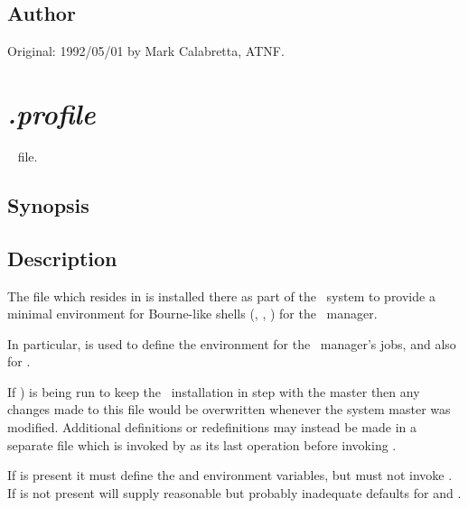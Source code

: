 \subsection*{Author}

Original: 1992/05/01 by Mark Calabretta, ATNF.


\newpage
\section{\textit{.profile}}
\label{.profile}

\aipspp\  file.

\subsection*{Synopsis}

\begin{synopsis}
\end{synopsis}

\subsection*{Description}

The  file which resides in  is installed there
as part of the \aipspp\ system to provide a minimal environment for
Bourne-like shells (, , ) for the
\aipspp\ manager.

In particular,  is used to define the environment for the
\aipspp\ manager's  jobs, and also for
.

If ) is being run to keep the \aipspp\ installation in step
with the master then any changes made to this file would be overwritten
whenever the system master was modified.  Additional definitions or
redefinitions may instead be made in a separate  file
which is invoked by  as its last operation before invoking
.


If  is present it must define the  and
 environment variables, but must not invoke .
If  is not present  will supply
reasonable but probably inadequate defaults for  and .

